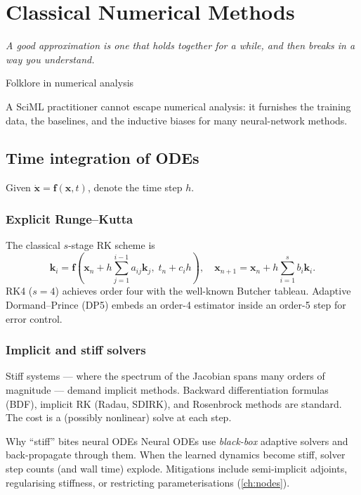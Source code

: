 \chapter{Classical Numerical Methods}
\label{ch:numerics}

\epigraph{\itshape A good approximation is one that holds together for a
while, and then breaks in a way you understand.}{Folklore in numerical
analysis}

A SciML practitioner cannot escape numerical analysis: it furnishes
the training data, the baselines, and the inductive biases for many
neural-network methods.

\section{Time integration of ODEs}
Given $\dot{\bm{x}}=\bm{f}(\bm{x},t)$, denote the time step $h$.

\subsection{Explicit Runge--Kutta}
The classical $s$-stage RK scheme is
\begin{equation}
\bm{k}_i = \bm{f}\!\left(\bm{x}_n + h\sum_{j=1}^{i-1}a_{ij}\bm{k}_j,\; t_n+c_ih\right),\quad
\bm{x}_{n+1}=\bm{x}_n+h\sum_{i=1}^s b_i\bm{k}_i.
\end{equation}
RK4 ($s=4$) achieves order four with the well-known Butcher tableau.
Adaptive Dormand--Prince (DP5) embeds an order-4 estimator inside an
order-5 step for error control.

\subsection{Implicit and stiff solvers}
Stiff systems --- where the spectrum of the Jacobian spans many orders
of magnitude --- demand implicit methods. Backward differentiation
formulas (BDF), implicit RK (Radau, SDIRK), and Rosenbrock methods are
standard. The cost is a (possibly nonlinear) solve at each step.

\begin{insight}{Why ``stiff'' bites neural ODEs}
Neural ODEs use \emph{black-box} adaptive solvers and back-propagate
through them. When the learned dynamics become stiff, solver step
counts (and wall time) explode. Mitigations include semi-implicit
adjoints, regularising stiffness, or restricting parameterisations
(\cref{ch:nodes}).
\end{insight}

